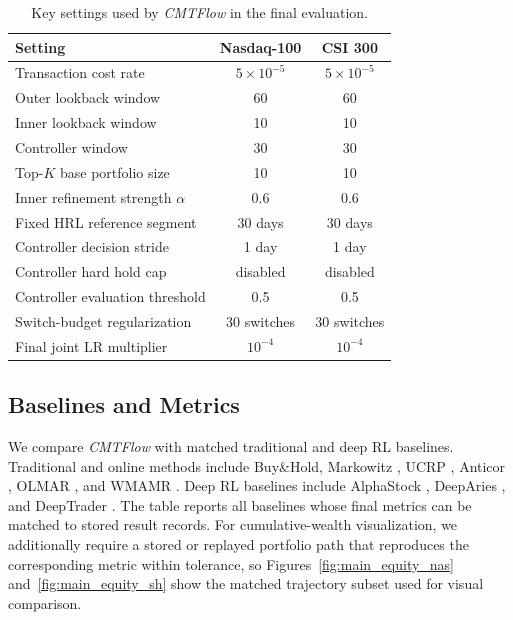 \documentclass[letterpaper]{article} %
\begin{document}
\begin{table}[t]
\centering
\caption{Key settings used by \textit{CMTFlow} in the final evaluation.}
\label{tab:hyperparam}
\small
\setlength{\tabcolsep}{6pt}
\begin{tabular}{lcc}
\toprule
\textbf{Setting} & \textbf{Nasdaq-100} & \textbf{CSI 300} \\
\midrule
Transaction cost rate & \(5\times10^{-5}\) & \(5\times10^{-5}\) \\
Outer lookback window & 60 & 60 \\
Inner lookback window & 10 & 10 \\
Controller window & 30 & 30 \\
Top-\(K\) base portfolio size & 10 & 10 \\
Inner refinement strength \(\alpha\) & 0.6 & 0.6 \\
Fixed HRL reference segment & 30 days & 30 days \\
Controller decision stride & 1 day & 1 day \\
Controller hard hold cap & disabled & disabled \\
Controller evaluation threshold & 0.5 & 0.5 \\
Switch-budget regularization & 30 switches & 30 switches \\
Final joint LR multiplier & \(10^{-4}\) & \(10^{-4}\) \\
\bottomrule
\end{tabular}
\end{table}

\subsection{Baselines and Metrics}

We compare \textit{CMTFlow} with matched traditional and deep RL baselines. Traditional and online methods include Buy\&Hold, Markowitz \citep{MVO}, UCRP \citep{UCRP}, Anticor \citep{ANTICOR}, OLMAR \citep{OLMAR}, and WMAMR \citep{WMAMR}. Deep RL baselines include AlphaStock \citep{alphastock}, DeepAries \citep{deeparies2025}, and DeepTrader \citep{6}. The table reports all baselines whose final metrics can be matched to stored result records. For cumulative-wealth visualization, we additionally require a stored or replayed portfolio path that reproduces the corresponding metric within tolerance, so Figures~\ref{fig:main_equity_nas} and~\ref{fig:main_equity_sh} show the matched trajectory subset used for visual comparison.
\end{document}
